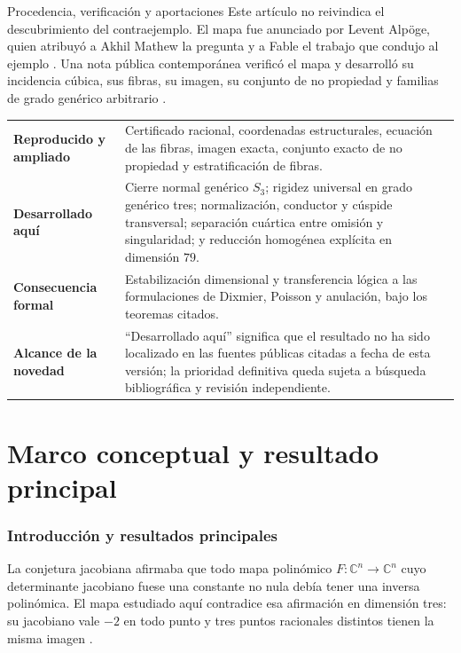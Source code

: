 \documentclass[11pt]{article}
\theoremstyle{definition}
\theoremstyle{remark}
\newcommand{\C}{\mathbb{C}}
\begin{document}
\begin{resultbox}{Procedencia, verificaci\'on y aportaciones}
Este art\'iculo no reivindica el descubrimiento del contraejemplo. El mapa fue
anunciado por Levent Alp\"oge, quien atribuy\'o a Akhil Mathew la pregunta y a
Fable el trabajo que condujo al ejemplo \cite{AlpogeAnnouncement2026}. Una
nota p\'ublica contempor\'anea verific\'o el mapa y desarroll\'o su incidencia
c\'ubica, sus fibras, su imagen, su conjunto de no propiedad y familias de
grado gen\'erico arbitrario \cite{CounterexampleNote2026}.

\renewcommand{\arraystretch}{1.25}
\begin{tabularx}{\textwidth}{@{}>{\raggedright\arraybackslash\sffamily\bfseries\color{deepblue}}p{}X@{}}
Reproducido y ampliado & Certificado racional, coordenadas estructurales,
ecuaci\'on de las fibras, imagen exacta, conjunto exacto de no propiedad y
estratificaci\'on de fibras.\\
Desarrollado aqu\'i & Cierre normal gen\'erico $S_3$; rigidez universal en
grado gen\'erico tres; normalizaci\'on, conductor y c\'uspide transversal;
separaci\'on cu\'artica entre omisi\'on y singularidad; y reducci\'on homog\'enea
expl\'icita en dimensi\'on $79$.\\
Consecuencia formal & Estabilizaci\'on dimensional y transferencia l\'ogica a
las formulaciones de Dixmier, Poisson y anulaci\'on, bajo los teoremas citados.\\
Alcance de la novedad & ``Desarrollado aqu\'i'' significa que el resultado no
ha sido localizado en las fuentes p\'ublicas citadas a fecha de esta versi\'on;
la prioridad definitiva queda sujeta a b\'usqueda bibliogr\'afica y revisi\'on
independiente.\\
\end{tabularx}
\end{resultbox}

\clearpage
\tableofcontents
\clearpage
\listoffigures
\clearpage
{}

\part{Marco conceptual y resultado principal}

\section{Introducci\'on y resultados principales}

La conjetura jacobiana afirmaba que todo mapa polin\'omico
$F\colon\C^n\to\C^n$ cuyo determinante jacobiano fuese una constante no nula
deb\'ia tener una inversa polin\'omica. El mapa estudiado aqu\'i contradice esa
afirmaci\'on en dimensi\'on tres: su jacobiano vale $-2$ en todo punto y tres
puntos racionales distintos tienen la misma imagen
\cite{AlpogeAnnouncement2026,CounterexampleNote2026}.
\end{document}
